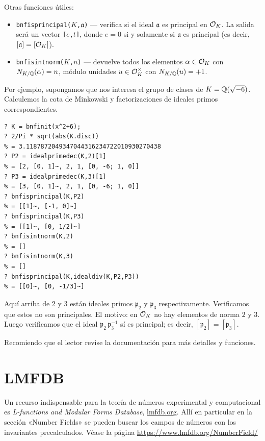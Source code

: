 Otras funciones útiles:
\begin{itemize}
\item \texttt{bnfisprincipal($K$,$\mathfrak{a}$)} --- verifica si el ideal
  $\mathfrak{a}$ es principal en $\mathcal{O}_K$. La salida será un vector
  \texttt{[$e$,$t$]}, donde $e = 0$ si y solamente si $\mathfrak{a}$ es
  principal (es decir, $[\mathfrak{a}] = [\mathcal{O}_K]$).

\item \texttt{bnfisintnorm($K$,$n$)} --- devuelve todos los elementos
  $\alpha \in \mathcal{O}_K$ con $N_{K/\mathbb{Q}} (\alpha) = n$, módulo unidades
  $u \in \mathcal{O}_K^\times$ con $N_{K/\mathbb{Q}} (u) = +1$.
\end{itemize}

Por ejemplo, supongamos que nos interesa el grupo de clases de
$K = \mathbb{Q} (\sqrt{-6})$. Calculemos la cota de Minkowski y factorizaciones de
ideales primos correspondientes.

\begin{shaded}
\begin{verbatim}
? K = bnfinit(x^2+6);
? 2/Pi * sqrt(abs(K.disc))
% = 3.1187872049347044316234722010930270438
? P2 = idealprimedec(K,2)[1]
% = [2, [0, 1]~, 2, 1, [0, -6; 1, 0]]
? P3 = idealprimedec(K,3)[1]
% = [3, [0, 1]~, 2, 1, [0, -6; 1, 0]]
? bnfisprincipal(K,P2)
% = [[1]~, [-1, 0]~]
? bnfisprincipal(K,P3)
% = [[1]~, [0, 1/2]~]
? bnfisintnorm(K,2)
% = []
? bnfisintnorm(K,3)
% = []
? bnfisprincipal(K,idealdiv(K,P2,P3))
% = [[0]~, [0, -1/3]~]
\end{verbatim}
\end{shaded}

Aquí arriba de $2$ y $3$ están ideales primos $\mathfrak{p}_2$ y
$\mathfrak{p}_3$ respectivamente. Verificamos que estos no son principales.
El motivo: en $\mathcal{O}_K$ no hay elementos de norma $2$ y $3$. Luego verificamos
que el ideal $\mathfrak{p}_2\,\mathfrak{p}_3^{-1}$ sí es principal; es decir,
$[\mathfrak{p}_2] = [\mathfrak{p}_3]$.

Recomiendo que el lector revise la documentación para más detalles y funciones.


\section{LMFDB}

Un recurso indispensable para la teoría de números experimental y computacional
es \emph{{L-functions} and Modular Forms Database},
\href{https://www.lmfdb.org/}{lmfdb.org}. Allí en particular en la sección
«Number Fields» se pueden buscar los campos de números con los invariantes
precalculados. Véase la página \url{https://www.lmfdb.org/NumberField/}

